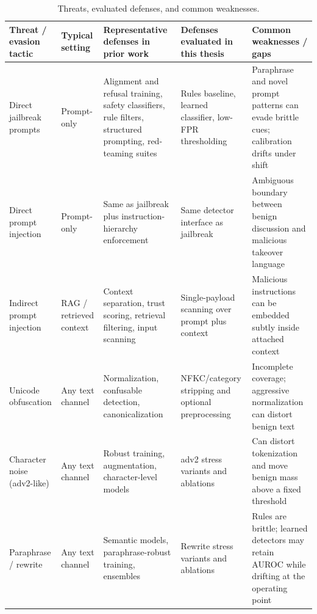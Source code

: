 \begin{table}[t]
\centering
\caption{Threats, evaluated defenses, and common weaknesses.}
\label{tab:threats_defenses}
\scriptsize
\begin{tabularx}{\textwidth}{p{}p{}p{}p{}X}
\toprule
Threat / evasion tactic & Typical setting & Representative defenses in prior work & Defenses evaluated in this thesis & Common weaknesses / gaps \\
\midrule
Direct jailbreak prompts & Prompt-only & Alignment and refusal training, safety classifiers, rule filters, structured prompting, red-teaming suites & Rules baseline, learned classifier, low-FPR thresholding & Paraphrase and novel prompt patterns can evade brittle cues; calibration drifts under shift \\
Direct prompt injection & Prompt-only & Same as jailbreak plus instruction-hierarchy enforcement & Same detector interface as jailbreak & Ambiguous boundary between benign discussion and malicious takeover language \\
Indirect prompt injection & RAG / retrieved context & Context separation, trust scoring, retrieval filtering, input scanning & Single-payload scanning over prompt plus context & Malicious instructions can be embedded subtly inside attached context \\
Unicode obfuscation & Any text channel & Normalization, confusable detection, canonicalization & NFKC/category stripping and optional preprocessing & Incomplete coverage; aggressive normalization can distort benign text \\
Character noise (adv2-like) & Any text channel & Robust training, augmentation, character-level models & adv2 stress variants and ablations & Can distort tokenization and move benign mass above a fixed threshold \\
Paraphrase / rewrite & Any text channel & Semantic models, paraphrase-robust training, ensembles & Rewrite stress variants and ablations & Rules are brittle; learned detectors may retain AUROC while drifting at the operating point \\
\bottomrule
\end{tabularx}
\normalsize
\end{table}